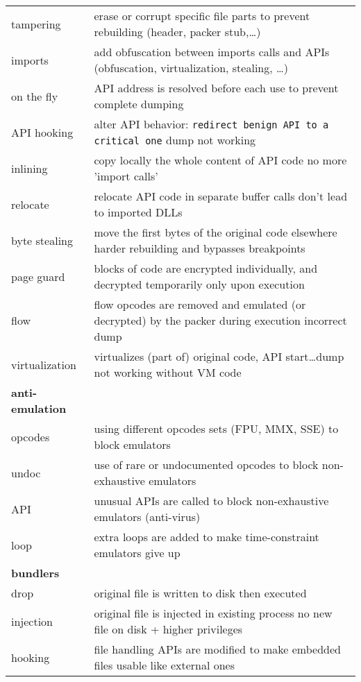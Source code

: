 \begin{tabular}{ll}
\midrule
tampering		& erase or corrupt specific file parts to prevent rebuilding (header, packer stub,\ldots) \\
imports 		& add obfuscation between imports calls and APIs (obfuscation, virtualization, stealing, \ldots)\\
on the fly		& API address is resolved before each use to prevent complete dumping \\
API hooking		& alter API behavior: {\tt redirect benign API to a critical one} \ra dump not working \\
inlining		& copy locally the whole content of API code \ra no more 'import calls'\\
relocate		& relocate API code in separate buffer \ra calls don't lead to imported DLLs\\
byte stealing	& move the first bytes of the original code elsewhere \ra harder rebuilding and bypasses breakpoints\\
page guard	 	& blocks of code are encrypted individually, and decrypted temporarily only upon execution \\
flow			& flow opcodes are removed and emulated (or decrypted) by the packer during execution \ra incorrect dump\\
virtualization	& virtualizes (part of) original code, API start\ldots \ra dump not working without VM code \rowcolors{0}{white}{lightgray}\\

\midrule
{\bf anti-emulation} & \\
\midrule
opcodes		& using different opcodes sets (FPU, MMX, SSE) to block emulators\\
undoc			& use of rare or undocumented opcodes to block non-exhaustive emulators \\
API			& unusual APIs are called to block non-exhaustive emulators (anti-virus)\\
loop			& extra loops are added to make time-constraint emulators give up \rowcolors{0}{white}{lightgray}\\
\midrule
{\bf bundlers} & \\
\midrule
drop			& original file is written to disk then executed \\
injection		& original file is injected in existing process \ra no new file on disk + higher privileges \\
hooking		& file handling APIs are modified to make embedded files usable like external ones \rowcolors{0}{white}{lightgray}\\

\bottomrule

\end{tabular}


\sig

